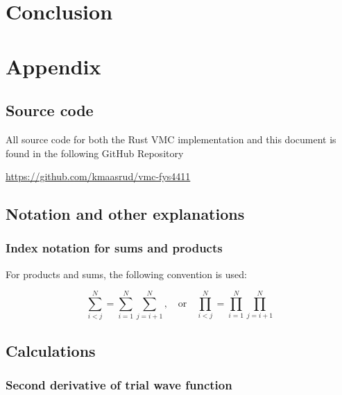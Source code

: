 \documentclass[
]{article}
\begin{document}
\hypertarget{conclusion}{%
\section{Conclusion}\label{conclusion}}

\clearpage
\appendix

\hypertarget{appendix}{%
\section{Appendix}\label{appendix}}

\hypertarget{source-code}{%
\subsection{Source code}\label{source-code}}

All source code for both the Rust VMC implementation and this document
is found in the following GitHub Repository

\url{https://github.com/kmaasrud/vmc-fys4411}

\hypertarget{notation-and-other-explanations}{%
\subsection{Notation and other
explanations}\label{notation-and-other-explanations}}

\hypertarget{index-notation-for-sums-and-products}{%
\subsubsection{Index notation for sums and
products}\label{index-notation-for-sums-and-products}}

For products and sums, the following convention is used:

\[\sum_{i <j}^N = \sum_{i=1}^N \sum_{j=i+1}^N,\quad \text{or}\quad \prod_{i <j}^N = \prod_{i=1}^N \prod_{j=i+1}^N\]

\hypertarget{calculations}{%
\subsection{Calculations}\label{calculations}}

\hypertarget{second-derivative-of-trial-wave-function}{%
\subsubsection{Second derivative of trial wave
function}\label{second-derivative-of-trial-wave-function}}
\end{document}
